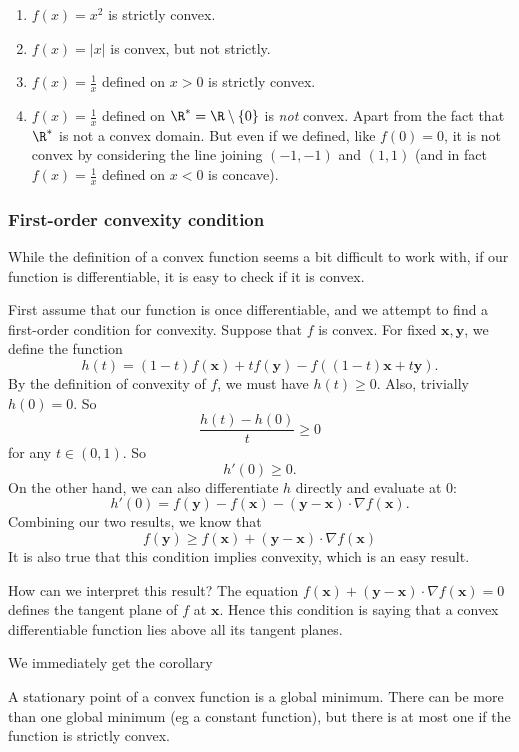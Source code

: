 \documentclass[a4paper]{article}
\begin{document}
\begin{eg}\leavevmode
  \begin{enumerate}
    \item $f(x) = x^2$ is strictly convex.
    \item $f(x) = |x|$ is convex, but not strictly.
    \item $f(x) = \frac{1}{x}$ defined on $x > 0$ is strictly convex.
    \item $f(x) = \frac{1}{x}$ defined on $\R^* = \R \setminus \{0\}$ is \emph{not} convex. Apart from the fact that $\R^*$ is not a convex domain. But even if we defined, like $f(0) = 0$, it is not convex by considering the line joining $(-1, -1)$ and $(1, 1)$ (and in fact $f(x) = \frac{1}{x}$ defined on $x < 0$ is concave).
  \end{enumerate}
\end{eg}
\subsubsection{First-order convexity condition}
While the definition of a convex function seems a bit difficult to work with, if our function is differentiable, it is easy to check if it is convex.

First assume that our function is once differentiable, and we attempt to find a first-order condition for convexity. Suppose that $f$ is convex. For fixed $\mathbf{x}, \mathbf{y}$, we define the function
\[
  h(t) = (1 - t)f(\mathbf{x}) + tf(\mathbf{y}) - f((1 - t)\mathbf{x} + t \mathbf{y}).
\]
By the definition of convexity of $f$, we must have $h(t) \geq 0$. Also, trivially $h(0) = 0$. So
\[
  \frac{h(t) - h(0)}{t} \geq 0
\]
for any $t\in (0, 1)$. So
\[
  h'(0) \geq 0.
\]
On the other hand, we can also differentiate $h$ directly and evaluate at $0$:
\[
  h'(0) = f(\mathbf{y}) - f(\mathbf{x}) - (\mathbf{y} - \mathbf{x})\cdot \nabla f (\mathbf{x}).
\]
Combining our two results, we know that
\[
  f(\mathbf{y}) \geq f(\mathbf{x}) + (\mathbf{y} - \mathbf{x})\cdot \nabla f(\mathbf{x}) \tag{$\dagger$}
\]
It is also true that this condition implies convexity, which is an easy result.

How can we interpret this result? The equation $f(\mathbf{x}) + (\mathbf{y} - \mathbf{x}) \cdot \nabla f(\mathbf{x}) = 0$ defines the tangent plane of $f$ at $\mathbf{x}$. Hence this condition is saying that a convex differentiable function lies above all its tangent planes.

We immediately get the corollary
\begin{cor}
  A stationary point of a convex function is a global minimum. There can be more than one global minimum (eg a constant function), but there is at most one if the function is strictly convex.
\end{cor}
\end{document}
